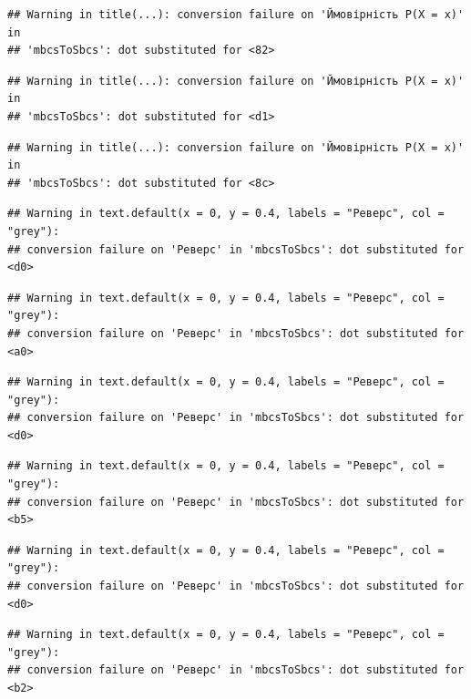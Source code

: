 \documentclass[
  11pt,
]{book}
\begin{document}
\begin{verbatim}
## Warning in title(...): conversion failure on 'Ймовірність P(X = x)' in
## 'mbcsToSbcs': dot substituted for <82>
\end{verbatim}

\begin{verbatim}
## Warning in title(...): conversion failure on 'Ймовірність P(X = x)' in
## 'mbcsToSbcs': dot substituted for <d1>
\end{verbatim}

\begin{verbatim}
## Warning in title(...): conversion failure on 'Ймовірність P(X = x)' in
## 'mbcsToSbcs': dot substituted for <8c>
\end{verbatim}

\begin{verbatim}
## Warning in text.default(x = 0, y = 0.4, labels = "Реверс", col = "grey"):
## conversion failure on 'Реверс' in 'mbcsToSbcs': dot substituted for <d0>
\end{verbatim}

\begin{verbatim}
## Warning in text.default(x = 0, y = 0.4, labels = "Реверс", col = "grey"):
## conversion failure on 'Реверс' in 'mbcsToSbcs': dot substituted for <a0>
\end{verbatim}

\begin{verbatim}
## Warning in text.default(x = 0, y = 0.4, labels = "Реверс", col = "grey"):
## conversion failure on 'Реверс' in 'mbcsToSbcs': dot substituted for <d0>
\end{verbatim}

\begin{verbatim}
## Warning in text.default(x = 0, y = 0.4, labels = "Реверс", col = "grey"):
## conversion failure on 'Реверс' in 'mbcsToSbcs': dot substituted for <b5>
\end{verbatim}

\begin{verbatim}
## Warning in text.default(x = 0, y = 0.4, labels = "Реверс", col = "grey"):
## conversion failure on 'Реверс' in 'mbcsToSbcs': dot substituted for <d0>
\end{verbatim}

\begin{verbatim}
## Warning in text.default(x = 0, y = 0.4, labels = "Реверс", col = "grey"):
## conversion failure on 'Реверс' in 'mbcsToSbcs': dot substituted for <b2>
\end{verbatim}
\end{document}
